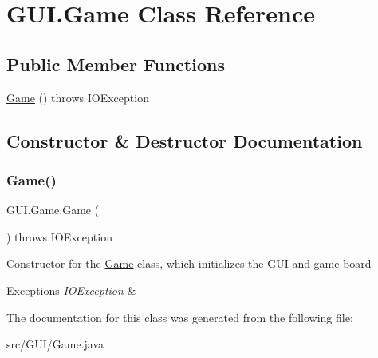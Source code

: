 \hypertarget{class_g_u_i_1_1_game}{}\section{G\+U\+I.\+Game Class Reference}
\label{class_g_u_i_1_1_game}
\subsection*{Public Member Functions}
\begin{DoxyCompactItemize}
\item 
\hyperlink{class_g_u_i_1_1_game_a97c23a5cb3fed78d68ef75d6d889b77a}{Game} ()  throws I\+O\+Exception 
\end{DoxyCompactItemize}


\subsection{Constructor \& Destructor Documentation}
\mbox{\label{class_g_u_i_1_1_game_a97c23a5cb3fed78d68ef75d6d889b77a}} 
\subsubsection{\texorpdfstring{Game()}{Game()}}
{\footnotesize\ttfamily G\+U\+I.\+Game.\+Game (\begin{DoxyParamCaption}{ }\end{DoxyParamCaption}) throws I\+O\+Exception}

Constructor for the \hyperlink{class_g_u_i_1_1_game}{Game} class, which initializes the G\+UI and game board 
\begin{DoxyExceptions}{Exceptions}
{\em I\+O\+Exception} & \\
\hline
\end{DoxyExceptions}


The documentation for this class was generated from the following file\+:\begin{DoxyCompactItemize}
\item 
src/\+G\+U\+I/Game.\+java\end{DoxyCompactItemize}
